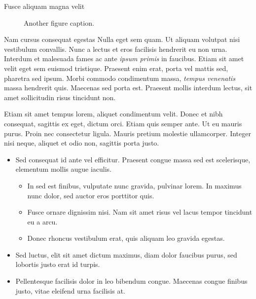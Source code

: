 \documentclass[final]{beamer}
\begin{document}
\begin{frame}[label={sec:org5a641b0}]{}
\begin{columns}
\begin{column}{0.3\columnwidth}
\begin{block}{Fusce aliquam magna velit}
\begin{figure}
  \centering
  \caption{Another figure caption.}
\end{figure}
\end{block}

\begin{block}{Nam cursus consequat egestas}
Nulla eget sem quam. Ut aliquam volutpat nisi vestibulum convallis. Nunc a
lectus et eros facilisis hendrerit eu non urna. Interdum et malesuada fames ac
ante \emph{ipsum primis} in faucibus. Etiam sit amet velit eget sem euismod
tristique. Praesent enim erat, porta vel mattis sed, pharetra sed ipsum. Morbi
commodo condimentum massa, \emph{tempus venenatis} massa hendrerit quis. Maecenas sed
porta est. Praesent mollis interdum lectus, sit amet sollicitudin risus
tincidunt non.

Etiam sit amet tempus lorem, aliquet condimentum velit. Donec et nibh consequat,
sagittis ex eget, dictum orci. Etiam quis semper ante. Ut eu mauris purus. Proin
nec consectetur ligula. Mauris pretium molestie ullamcorper. Integer nisi neque,
aliquet et odio non, sagittis porta justo.

\begin{itemize}
\item \alert{Sed consequat} id ante vel efficitur. Praesent congue massa sed est
scelerisque, elementum mollis augue iaculis.
\begin{itemize}
\item In sed est finibus, vulputate nunc gravida, pulvinar lorem. In maximus nunc
dolor, sed auctor eros porttitor quis.
\item Fusce ornare dignissim nisi.  Nam sit amet risus vel lacus tempor tincidunt
eu a arcu.
\item Donec rhoncus vestibulum erat, quis aliquam leo gravida egestas.
\end{itemize}
\item \alert{Sed luctus, elit sit amet} dictum maximus, diam dolor faucibus purus, sed
lobortis justo erat id turpis.
\item \alert{Pellentesque facilisis dolor in leo} bibendum congue.  Maecenas congue
finibus justo, vitae eleifend urna facilisis at.
\end{itemize}


\end{block}
\end{column}
\end{columns}
\end{frame}
\end{document}
